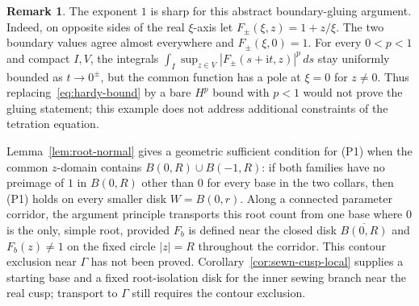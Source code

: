\documentclass[11pt,a4paper]{article}
\theoremstyle{definition}
\newtheorem{remark}[theorem]{Remark}
\newcommand{\ii}{\mathrm{i}}
\begin{document}
\begin{remark}
The exponent $1$ is sharp for this abstract boundary-gluing argument.
Indeed, on opposite sides of the real $\xi$-axis let
$F_\pm(\xi,z)=1+z/\xi$.  The two boundary values agree almost
everywhere and $F_\pm(\xi,0)=1$.  For every $0<p<1$ and compact
$I,V$, the integrals
$\int_I\sup_{z\in V}|F_\pm(s+\ii t,z)|^p\,ds$ stay uniformly bounded
as $t\to0^\pm$, but the common function has a pole at $\xi=0$ for
$z\ne0$.  Thus replacing~\eqref{eq:hardy-bound} by a bare $H^p$
bound with $p<1$ would not prove the gluing statement; this example
does not address additional constraints of the tetration equation.
\end{remark}

Lemma~\ref{lem:root-normal} gives a geometric sufficient condition for (P1)
when the common $z$-domain contains $B(0,R)\cup B(-1,R)$: if both families
have no preimage of $1$ in $B(0,R)$ other than $0$ for every base in
the two collars, then (P1) holds on every smaller disk $W=B(0,r)$.
Along a connected parameter corridor, the argument principle transports
this root count from one base where $0$ is the only, simple root, provided
$F_b$ is defined near the closed disk $\overline{B(0,R)}$ and
$F_b(z)\ne1$ on the fixed circle $|z|=R$ throughout the corridor.
This contour exclusion near $\Gamma$ has not been proved.
Corollary~\ref{cor:sewn-cusp-local} supplies a starting base and a fixed
root-isolation disk for the inner sewing branch near the real cusp;
transport to $\Gamma$ still requires the contour exclusion.
\end{document}
